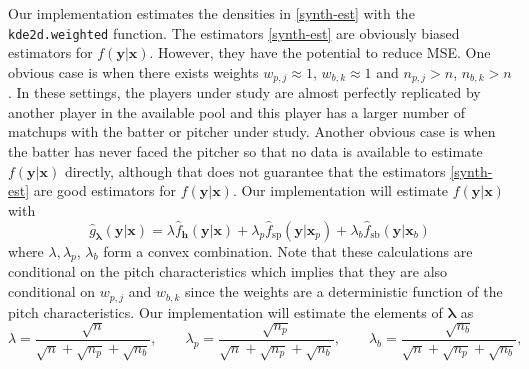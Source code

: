 \documentclass[11pt]{article}
\newcommand{\y}{\textbf{y}}
\newcommand{\x}{\textbf{x}}
\newcommand{\h}{\textbf{h}}
\newcommand{\wstar}{w^{\textstyle{*}}}
\newcommand{\lambdabf}{\boldsymbol{\lambda}}
\begin{document}

Our implementation estimates the densities in \eqref{synth-est} with the \texttt{kde2d.weighted} function. The estimators \eqref{synth-est} are obviously biased estimators for $f(\y|\x)$. However, they have the potential to reduce MSE. One obvious case is when there exists weights $w_{p,j} \approx 1$, $w_{b,k} \approx 1$  and $n_{p,j} > n$, $n_{b,k} > n$. In these settings, the players under study are almost perfectly replicated by another player in the available pool and this player has a larger number of matchups with the batter or pitcher under study. Another obvious case is when the batter has never faced the pitcher so that no data is available to estimate $f(\y|\x)$ directly, although that does not guarantee that the estimators \eqref{synth-est} are good estimators for $f(\y|\x)$. Our implementation will estimate $f(\y|\x)$ with
\begin{equation} \label{sd-implem}
  \hat{g}_{\lambdabf}(\y|\x) = \lambda \hat f_\h(\y|\x) 
    + \lambda_p \hat f_{\text{sp}}(\y|\x_p) 
    + \lambda_b \hat f_{\text{sb}}(\y|\x_b)
\end{equation}
where $\lambda,\lambda_p$, $\lambda_b$ form a convex combination. %
Note that these calculations are conditional on the pitch characteristics which implies that they are also conditional on $w_{p,j}$ and $w_{b,k}$ since the weights are a deterministic function of the pitch characteristics. Our implementation will estimate the elements of $\lambdabf$ as 
$$
  \lambda = \frac{\sqrt{n}}{\sqrt{n} + \sqrt{n_p} + \sqrt{n_b}}, \qquad
  \lambda_p = \frac{\sqrt{n_p}}{\sqrt{n} + \sqrt{n_p} + \sqrt{n_b}}, \qquad
  \lambda_b = \frac{\sqrt{n_b}}{\sqrt{n} + \sqrt{n_p} + \sqrt{n_b}},
$$
\end{document}
